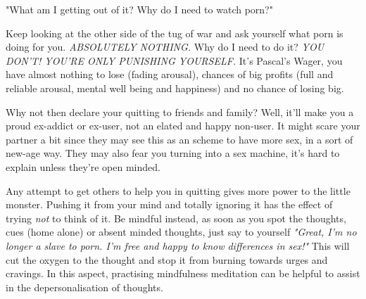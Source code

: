 \documentclass[easypeasy.tex]{subfiles}
\begin{document}
  {\Large "What am I getting out of it? Why do I need to watch porn?"}

Keep looking at the other side of the tug of war and ask yourself what porn is doing for you. \textit{ABSOLUTELY NOTHING.} Why do I need to do it? \textit{YOU DON'T! YOU'RE ONLY PUNISHING YOURSELF.} It's Pascal's Wager, you have almost nothing to lose (fading arousal), chances of big profits (full and reliable arousal, mental well being and happiness) and no chance of losing big.

Why not then declare your quitting to friends and family? Well, it'll make you a proud ex-addict or ex-user, not an elated and happy non-user. It might scare your partner a bit since they may see this as an scheme to have more sex, in a sort of new-age way. They may also fear you turning into a sex machine, it's hard to explain unless they're open minded.

Any attempt to get others to help you in quitting gives more power to the little monster. Pushing it from your mind and totally ignoring it has the effect of trying \textit{not} to think of it. Be mindful instead, as soon as you spot the thoughts, cues (home alone) or absent minded thoughts, just say to yourself \textit{"Great, I'm no longer a slave to porn. I'm free and happy to know differences in sex!"} This will cut the oxygen to the thought and stop it from burning towards urges and cravings. In this aspect, practising mindfulness meditation can be helpful to assist in the depersonalisation of thoughts.
\end{document}
